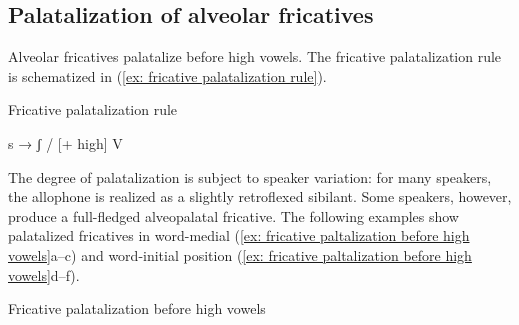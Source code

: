 
\subsection{Palatalization of alveolar fricatives}
\label{subsec: palatalization of alveolar fricatives}

Alveolar fricatives palatalize before high vowels. The fricative palatalization rule is schematized in (\ref{ex: fricative palatalization rule}).

\ea\label{ex: fricative palatalization rule}
Fricative palatalization rule

s  	→  ʃ / {\longrule} [+ high] V
\z

The degree of palatalization is subject to speaker variation: for many speakers, the allophone is realized as a slightly retroflexed sibilant. Some speakers, however, produce a full-fledged alveopalatal fricative. The following examples show palatalized fricatives in word-medial (\ref{ex: fricative paltalization before high vowels}a--c) and word-initial position (\ref{ex: fricative paltalization before high vowels}d--f).

\ea\label{ex: fricative paltalization before high vowels}
{Fricative palatalization before high vowels}

